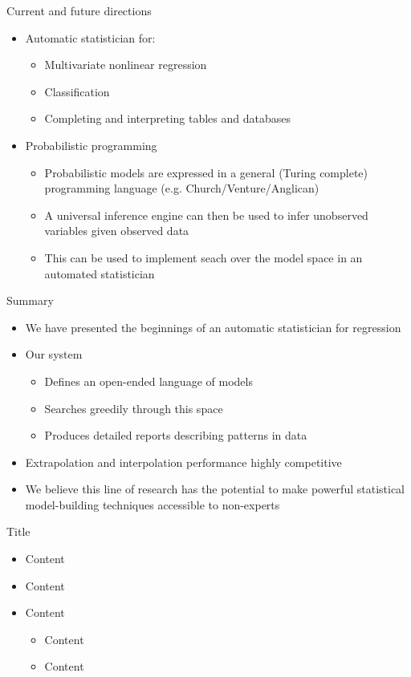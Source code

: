 \begin{frame}{Current and future directions}
  \begin{itemize}
    \item Automatic statistician for:
    \begin{itemize}
      \item Multivariate nonlinear regression
      \item Classification
      \item Completing and interpreting tables and databases
    \end{itemize}
    \vspace{\baselineskip}
    \item Probabilistic programming
    \begin{itemize}
      \item Probabilistic models are expressed in a general (Turing complete) programming
language (e.g. Church/Venture/Anglican)
      \item A universal inference engine can then be used to infer unobserved variables
given observed data
      \item This can be used to implement seach over the model space in an automated
statistician
    \end{itemize}
  \end{itemize}
\end{frame}

\begin{frame}{Summary}
  \begin{itemize}
    \item We have presented the beginnings of an automatic statistician for regression
    \vspace{\baselineskip}
    \item Our system
    \begin{itemize}
      \item Defines an open-ended language of models
      \item Searches greedily through this space
      \item Produces detailed reports describing patterns in data
    \end{itemize}
    \vspace{\baselineskip}
    \item Extrapolation and interpolation performance highly competitive
    \vspace{\baselineskip}
    \item We believe this line of research has the potential to make powerful statistical model-building techniques accessible to non-experts
  \end{itemize}
\end{frame}



\begin{frame}{Title}
  \begin{itemize}
    \item Content
    \vspace{\baselineskip}
    \item Content
    \vspace{\baselineskip}
    \item Content
    \begin{itemize}
       \item Content
       \item Content
     \end{itemize}
  \end{itemize}
\end{frame}